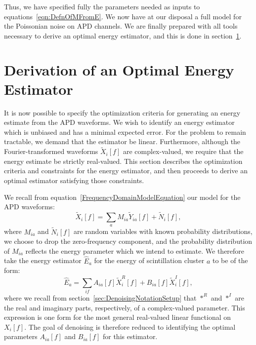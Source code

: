 Thus, we have specified fully the parameters needed as inputs to equations~\ref{eqn:DefnOfMFromE}.  We now have at our disposal a full model for the Poissonian noise on APD channels.  We are finally prepared with all tools necessary to derive an optimal energy estimator, and this is done in section~\ref{sec:DerivationOfEstimator}.

\section{Derivation of an Optimal Energy Estimator}\label{sec:DerivationOfEstimator}

It is now possible to specify the optimization criteria for generating an energy estimate from the APD waveforms.  We wish to identify an energy estimator which is unbiased and has a minimal expected error.  For the problem to remain tractable, we demand that the estimator be linear.  Furthermore, although the Fourier-transformed waveforms $\widetilde{X}_i[f]$ are complex-valued, we require that the energy estimate be strictly real-valued.  This section describes the optimization criteria and constraints for the energy estimator, and then proceeds to derive an optimal estimator satisfying those constraints.

We recall from equation~\ref{FrequencyDomainModelEquation} our model for the APD waveforms:
\begin{equation}\label{eqn:FrequencyDomainModelEquation2}
\widetilde{X}_i[f] = \sum_a M_{ia}\widetilde{Y}_{ia}[f] + \widetilde{N}_i[f],
\end{equation}
where $M_{ia}$ and $\widetilde{N}_i[f]$ are random variables with known probability distributions, we choose to drop the zero-frequency component, and the probability distribution of $M_{ia}$ reflects the energy parameter which we intend to estimate.  We therefore take the energy estimator $\widehat{E}_a$ for the energy of scintillation cluster $a$ to be of the form:
\begin{equation}
\widehat{E}_a = \sum_{if} A_{ia}[f] \widetilde{X}_i^R[f] + B_{ia}[f] \widetilde{X}_i^I[f],
\end{equation}
where we recall from section~\ref{sec:DenoisingNotationSetup} that $*^R$ and $*^I$ are the real and imaginary parts, respectively, of a complex-valued parameter.  This expression is one form for the most general real-valued linear functional on $X_i[f]$.  The goal of denoising is therefore reduced to identifying the optimal parameters $A_{ia}[f]$ and $B_{ia}[f]$ for this estimator.

